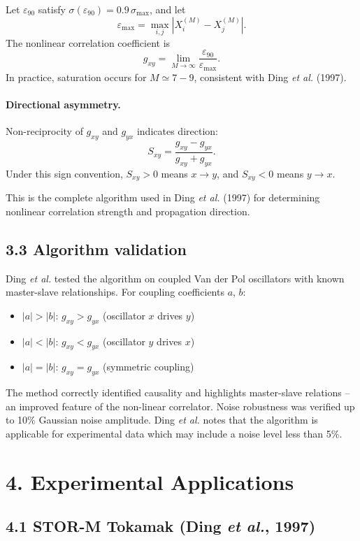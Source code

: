 \documentclass[11pt]{article}
\begin{document}
Let \(\varepsilon_{90}\) satisfy \(\sigma(\varepsilon_{90})=0.9\,\sigma_{\max}\), and let
\[
\varepsilon_{\max}=\max_{i,j}|X_i^{(M)}-X_j^{(M)}|.
\]
The nonlinear correlation coefficient is
\[
g_{xy}=\lim_{M\to\infty}\frac{\varepsilon_{90}}{\varepsilon_{\max}}.
\]
In practice, saturation occurs for \(M\simeq 7\!-\!9\), consistent with Ding \textit{et al.} (1997).

\paragraph{Directional asymmetry.}
Non-reciprocity of \(g_{xy}\) and \(g_{yx}\) indicates direction:
\[
S_{xy}=\frac{g_{xy}-g_{yx}}{g_{xy}+g_{yx}}.
\]
Under this sign convention, \(S_{xy}>0\) means \(x\to y\), and \(S_{xy}<0\) means \(y\to x\).

This is the complete algorithm used in Ding \textit{et al.} (1997) for determining nonlinear correlation strength and propagation direction.


\subsection*{3.3 Algorithm validation}

Ding \textit{et al.} tested the algorithm on coupled Van der Pol oscillators with known master-slave relationships. For coupling coefficients $a$, $b$: 
\begin{itemize}
\item $|a|>|b|$: $g_{xy}>g_{yx}$ (oscillator $x$ drives $y$)
\item $|a|<|b|$: $g_{xy}<g_{yx}$ (oscillator $y$ drives $x$)
\item $|a|=|b|$: $g_{xy}=g_{yx}$ (symmetric coupling)
\end{itemize}
The method correctly identified causality and highlights master-slave relations -- an improved feature of the non-linear correlator. Noise robustness was verified up to 10\% Gaussian noise amplitude. Ding \textit{et al.} notes that the algorithm is applicable for experimental data which may include a noise level less than 5$\%$. 

\section*{4. Experimental Applications}

\subsection*{4.1 STOR-M Tokamak (Ding \textit{et al.}, 1997)}
\end{document}
